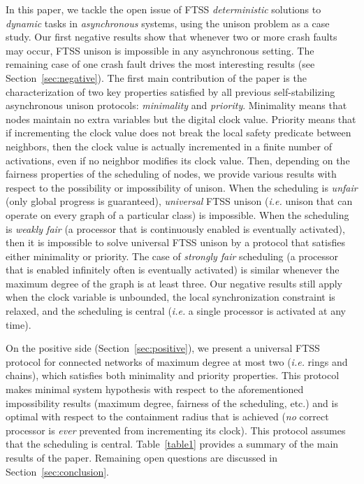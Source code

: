 \documentclass[11pt,english,letterpaper]{article}
\begin{document}
In this paper, we tackle the open issue of FTSS \emph{deterministic} solutions to \emph{dynamic} tasks in \emph{asynchronous} systems, using the unison problem as a case study. Our first negative results show that whenever two or more crash faults may occur, FTSS unison is impossible in any asynchronous setting. The remaining case of one crash fault drives the most interesting results (see Section~\ref{sec:negative}). The first main contribution of the paper is the characterization of two key properties satisfied by all previous self-stabilizing asynchronous unison protocols: \emph{minimality} and \emph{priority}. Minimality means that nodes maintain no extra variables but the digital clock value. Priority means that if incrementing the clock value does not break the local safety predicate between neighbors, then the clock value is actually incremented in a finite number of activations, even if no neighbor modifies its clock value. Then, depending on the fairness properties of the scheduling of nodes, we provide various results with respect to the possibility or impossibility of unison. When the scheduling is \emph{unfair} (only global progress is guaranteed), \emph{universal} FTSS unison (\emph{i.e.} unison that can operate on every graph of a particular class) is impossible. When the scheduling is \emph{weakly fair} (a processor that is continuously enabled is eventually activated), then it is impossible to solve universal FTSS unison by a protocol that satisfies either minimality or priority. The case of \emph{strongly fair} scheduling (a processor that is enabled infinitely often is eventually activated) is similar whenever the maximum degree of the graph is at least three. Our negative results still apply when the clock variable is unbounded, the local synchronization constraint is relaxed, and the scheduling is central (\emph{i.e.} a single processor is activated at any time).

On the positive side (Section~\ref{sec:positive}), we present a universal FTSS protocol for connected networks of maximum degree at most two (\emph{i.e.} rings and chains), which satisfies both minimality and priority properties. This protocol makes minimal system hypothesis with respect to the aforementioned impossibility results (maximum degree, fairness of the scheduling, etc.) and is optimal with respect to the containment radius that is achieved (\emph{no} correct processor is \emph{ever} prevented from incrementing its clock). This protocol assumes that the scheduling is central. Table~\ref{table1} provides a summary of the main results of the paper. Remaining open questions are discussed in Section~\ref{sec:conclusion}.
\end{document}
